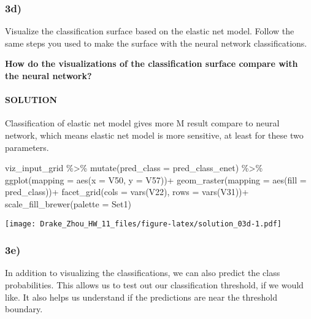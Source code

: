 \documentclass[
]{article}
\newenvironment{Shaded}{\begin{snugshade}}{\end{snugshade}}
\newcommand{\AttributeTok}[1]{\textcolor[rgb]{0.77,0.63,0.00}{#1}}
\newcommand{\FunctionTok}[1]{\textcolor[rgb]{0.00,0.00,0.00}{#1}}
\newcommand{\NormalTok}[1]{#1}
\newcommand{\SpecialCharTok}[1]{\textcolor[rgb]{0.00,0.00,0.00}{#1}}
\newcommand{\StringTok}[1]{\textcolor[rgb]{0.31,0.60,0.02}{#1}}
\begin{document}
\hypertarget{d-2}{%
\subsubsection{3d)}\label{d-2}}

Visualize the classification surface based on the elastic net model.
Follow the same steps you used to make the surface with the neural
network classifications.

\textbf{How do the visualizations of the classification surface compare
with the neural network?}

\hypertarget{solution-14}{%
\paragraph{SOLUTION}\label{solution-14}}

Classification of elastic net model gives more M result compare to
neural network, which means elastic net model is more sensitive, at
least for these two parameters.

\begin{Shaded}
\begin{Highlighting}[]
\NormalTok{viz\_input\_grid }\SpecialCharTok{\%\textgreater{}\%}
  \FunctionTok{mutate}\NormalTok{(}\AttributeTok{pred\_class =}\NormalTok{ pred\_class\_enet) }\SpecialCharTok{\%\textgreater{}\%}
  \FunctionTok{ggplot}\NormalTok{(}\AttributeTok{mapping =} \FunctionTok{aes}\NormalTok{(}\AttributeTok{x =}\NormalTok{ V50, }\AttributeTok{y =}\NormalTok{ V57))}\SpecialCharTok{+}
  \FunctionTok{geom\_raster}\NormalTok{(}\AttributeTok{mapping =} \FunctionTok{aes}\NormalTok{(}\AttributeTok{fill =}\NormalTok{ pred\_class))}\SpecialCharTok{+}
  \FunctionTok{facet\_grid}\NormalTok{(}\AttributeTok{cols =} \FunctionTok{vars}\NormalTok{(V22), }\AttributeTok{rows =} \FunctionTok{vars}\NormalTok{(V31))}\SpecialCharTok{+}
  \FunctionTok{scale\_fill\_brewer}\NormalTok{(}\AttributeTok{palette =} \StringTok{\textquotesingle{}Set1\textquotesingle{}}\NormalTok{)}
\end{Highlighting}
\end{Shaded}

\texttt{[image: Drake\_Zhou\_HW\_11\_files/figure-latex/solution\_03d-1.pdf]}

\hypertarget{e-2}{%
\subsubsection{3e)}\label{e-2}}

In addition to visualizing the classifications, we can also predict the
class probabilities. This allows us to test out our classification
threshold, if we would like. It also helps us understand if the
predictions are near the threshold boundary.
\end{document}
